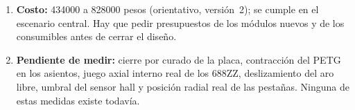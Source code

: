 \begin{resultado}
\begin{enumerate}[leftmargin=*]
        cenit (a confirmar en CAD).
  \item \textbf{Costo:} \num{434000} a \num{828000} pesos (orientativo, versión~2);  se
        cumple en el escenario central. Hay que pedir presupuestos de los módulos
        nuevos y de los consumibles antes de cerrar el diseño.
  \item \textbf{Pendiente de medir:} cierre por curado de la placa, contracción del PETG en
        los asientos, juego axial interno real de los 688ZZ, deslizamiento del aro libre,
        umbral del sensor hall y
        posición radial real de las pestañas. Ninguna de estas medidas existe todavía.
\end{enumerate}
\end{resultado}
